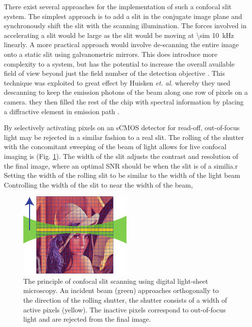 There exist several approaches for the implementation of such a confocal slit system.
The simplest approach is to add a slit in the conjugate image plane and synchronously shift the slit with the scanning illumination.
The forces involved in accelerating a slit would be large as the slit would be moving at \SI{\sim 10}{\kilo\hertz} linearly.
A more practical approach would involve de-scanning the entire image onto a static slit using galvanometric mirrors.
This does introduce more complexity to a system, but has the potential to increase the overall available field of view beyond just the field number of the detection objective \cite{Huisken}.
This technique was exploited to great effect by Huisken \emph{et. al.} whereby they used descanning to keep the emission photons of the beam along one row of pixels on a camera.
they then filled the rest of the chip with spectral information by placing a diffractive element in emission path \cite{}.

By selectively activating pixels on an sCMOS detector for read-off, out-of-focus light may be rejected in a similar fashion to a real slit.
The rolling of the shutter with the concomitant sweeping of the beam of light allows for live confocal imaging is (Fig. \ref{fig:slit_scanning_alt}).
The width of the slit adjusts the contrast and resolution of the final image, where an optimal SNR should be when the slit is of a similia.r
Setting the width of the rolling slit to be similar to the width of the light beam
Controlling the width of the slit to near the width of the beam,

\begin{figure}
  \centering
  \includegraphics{slit_scanning_alt}
  \caption{The principle of confocal slit scanning using digital light-sheet microscopy.
  An incident beam (green) approaches orthogonally to the direction of the rolling shutter, the shutter consists of a width of active pixels (yellow).
  The inactive pixels correspond to out-of-focus light and are rejected from the final image.}
  \label{fig:slit_scanning_alt}
\end{figure}

